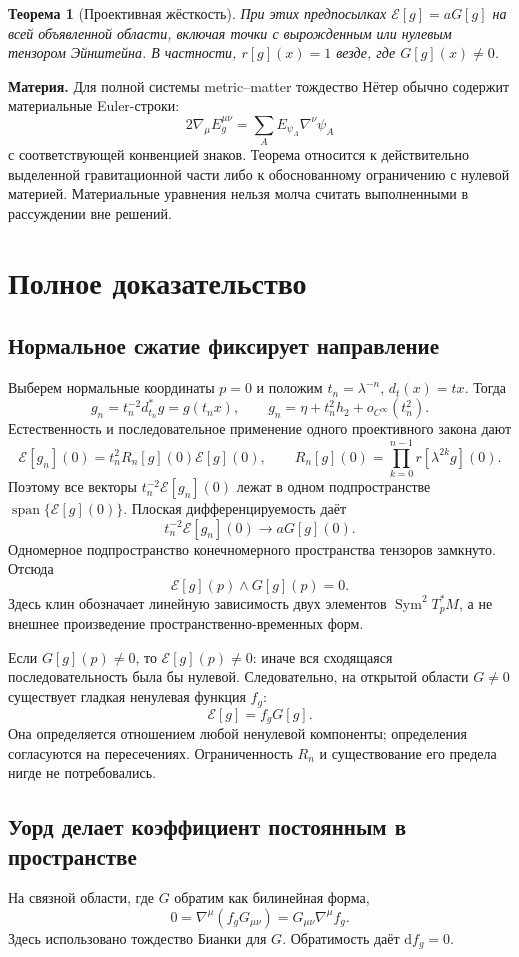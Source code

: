 \documentclass[11pt,a4paper]{article}
\newcommand{\E}{\mathcal E}
\newcommand{\dd}{\mathrm d}
\DeclareMathOperator{\Span}{span}
\newtheorem{theorem}{Теорема}
\begin{document}
\begin{theorem}[Проективная жёсткость]
При этих предпосылках $\E[g]=aG[g]$ на всей объявленной области, включая точки с вырожденным или нулевым тензором Эйнштейна. В частности, $r[g](x)=1$ везде, где $G[g](x)\ne0$.
\end{theorem}

\textbf{Материя.} Для полной системы metric--matter тождество Нётер обычно содержит материальные Euler-строки:
\[
2\nabla_\mu E_g^{\mu\nu}=\sum_A E_{\psi_A}\nabla^\nu\psi_A
\]
с соответствующей конвенцией знаков. Теорема относится к действительно выделенной гравитационной части либо к обоснованному ограничению с нулевой материей. Материальные уравнения нельзя молча считать выполненными в рассуждении вне решений.

\section{Полное доказательство}

\subsection{Нормальное сжатие фиксирует направление}
Выберем нормальные координаты $p=0$ и положим $t_n=\lambda^{-n}$,
$d_t(x)=tx$. Тогда
\[
g_n=t_n^{-2}d_{t_n}^*g=g(t_nx),\qquad
g_n=\eta+t_n^2h_2+o_{C^\infty}(t_n^2).
\]
Естественность и последовательное применение одного проективного закона дают
\[
\E[g_n](0)=t_n^2R_n[g](0)\E[g](0),\qquad
R_n[g](0)=\prod_{k=0}^{n-1}r[\lambda^{2k}g](0).
\]
Поэтому все векторы $t_n^{-2}\E[g_n](0)$ лежат в одном подпространстве
$\Span\{\E[g](0)\}$. Плоская дифференцируемость даёт
\[
t_n^{-2}\E[g_n](0)\longrightarrow aG[g](0).
\]
Одномерное подпространство конечномерного пространства тензоров замкнуто. Отсюда
\[
\E[g](p)\wedge G[g](p)=0.
\]
Здесь клин обозначает линейную зависимость двух элементов $\operatorname{Sym}^2T_p^*M$, а не внешнее произведение пространственно-временных форм.

Если $G[g](p)\ne0$, то $\E[g](p)\ne0$: иначе вся сходящаяся последовательность была бы нулевой. Следовательно, на открытой области $G\ne0$ существует гладкая ненулевая функция $f_g$:
\[
\E[g]=f_gG[g].
\]
Она определяется отношением любой ненулевой компоненты; определения согласуются на пересечениях. Ограниченность $R_n$ и существование его предела нигде не потребовались.

\subsection{Уорд делает коэффициент постоянным в пространстве}
На связной области, где $G$ обратим как билинейная форма,
\[
0=\nabla^\mu(f_gG_{\mu\nu})
  =G_{\mu\nu}\nabla^\mu f_g.
\]
Здесь использовано тождество Бианки для $G$. Обратимость даёт $\dd f_g=0$.
\end{document}
